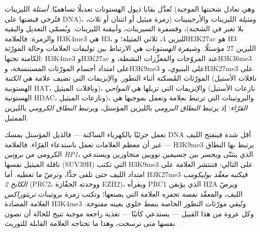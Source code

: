 \begin{definition}\label{def:b3:chromatin-epigenetics:histone-code}
تُعدَّل بقايا ذيول الهستونات تعديلًا تساهميًا: \emph{أستلة} الليزينات
(وهي تعادل شحنتها الموجبة فتُرخي قبضتها على DNA)، و\emph{مثيلة}
الليزينات والأرجينينات (زمرة ميثيل أو اثنتان أو ثلاث، بلا تغير في
الشحنة)، وفسفرة السيرينات، وأبيقنة الليزينات. ويُسمّى التعديل
 والبقية والزمرة: فالعلامة H3K4me3 هي  H3، الليزين 4،
ثلاثي المثيلة؛ وH3K27ac هو H3 الليزين 27 مؤستلًا. و\emph{شيفرة
الهستونات} هي الارتباط بين توليفات العلامات وحالة المورّثة الكامنة
تحتها: H3K4me3 وH3K27ac عند المروّجات والمعزِّزات النشطة، وH3K36me3
على امتداد أجسام المورّثات المستنسخة، وH3K9me3 على 
البنيوي، وH3K27me3 على المورّثات المُسكتة أثناء التطور. والإنزيمات
التي تضيف علامة هي \emph{الكتبة} (ناقلات الأستيل الهستونية HAT،
وناقلات الميثيل)، والإنزيمات التي تزيلها هي \emph{المواحي} (نازعات
الأستيل الهستونية HDAC، ونازعات الميثيل)، والبروتينات التي ترتبط
بعلامة وتعمل بموجبها هي \emph{القرّاء}: إذ يرتبط \emph{النطاق البرومي}
بالليزين المؤستل، ويرتبط \emph{النطاق الكرومي} بالليزين الممثيل.
\end{definition}

\begin{proposition}\label{prop:b3:chromatin-epigenetics:readers}
تعمل  جزئيًا بالكهرباء الساكنة --- فالذيل المؤستل يمسك DNA
أقل شدة فينفتح الليف --- غير أن معظم العلامات تعمل باستدعاء القرّاء.
فالعلامة H3K9me3 يرتبط بها النطاق الكرومي من \emph{بروتين 
HP1}، الذي يتثنّى ويجسر بين جسيمين نوويين متجاورين ويستدعي ناقلة
الميثيل نفسها (SUV39H) التي تكتب H3K9me3 على  التالي:
فتنتشر العلامة على امتداد الليف حتى تلقى حدًّا، وترصّ ما تغطيه.
أما H3K27me3 فيكتبه \emph{معقّد بوليكومب الكابح 2} (PRC2، ووحدته
الحفّازة EZH2)، ويقرأه PRC1 الذي يؤبقن H2A ويرصّ الليف، والمعقّد
نفسه تحفزه العلامة التي يصنعها؛ وتكتب زمرة بروتينات
\emph{تريثوراكس} العلامة المضادة H3K4me3 وتُبقي مورّثات التطور
الخاصة بنمط خلوي بعينه مفتوحة. وكل عروة من هذا القبيل --- 
يستدعي كاتبًا --- تغذية راجعة موجبة تتيح للحالة أن تصون نفسها متى
ترسخت، وهذا ما تحتاجه العلامة القابلة للتوريث.
\end{proposition}

